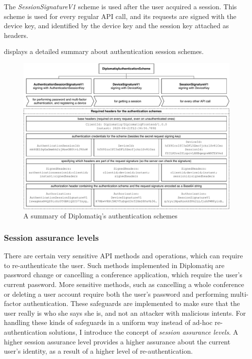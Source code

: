The \emph{SessionSignatureV1} scheme is used after the user acquired a session. This scheme is used for every regular API call, and its requests are signed with the device key, and identified by the device key and the session key attached as headers.

 displays a detailed summary about authentication session schemes.

\begin{figure}[!htb]
    \includegraphics[width=\textwidth]{figures/authentication-schemes.pdf}
    \caption{A summary of Diplomatiq's authentication schemes}
    \label{fig:authentication-schemes}
\end{figure}

\subsubsection{Session assurance levels}

There are certain very sensitive API methods and operations, which can require to re-authenticate the user. Such methods implemented in Diplomatiq are password change or cancelling a conference application, which require the user's current password. More sensitive methods, such as cancelling a whole conference or deleting a user account require both the user's password and performing multi-factor authentication. These safeguards are implemented to make sure that the user really is who she says she is, and not an attacker with malicious intents. For handling these kinds of safeguards in a uniform way instead of ad-hoc re-authentication solutions, I introduce the concept of \emph{session assurance levels}. A higher session assurance level provides a higher assurance about the current user's identity, as a result of a higher level of re-authentication.

